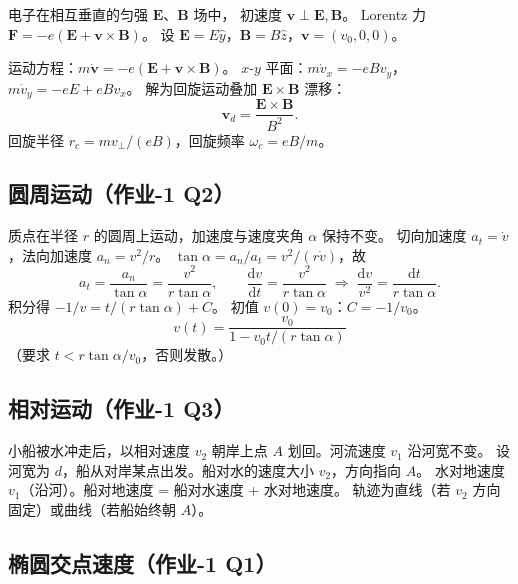 \documentclass[UTF8,a4paper,11pt]{ctexart}
\begin{document}
电子在相互垂直的匀强 $\boldsymbol E$、$\boldsymbol B$ 场中，
初速度 $\boldsymbol v\perp\boldsymbol E,\boldsymbol B$。
Lorentz 力 $\boldsymbol F=-e(\boldsymbol E+\boldsymbol v\times\boldsymbol B)$。
设 $\boldsymbol E=E\hat y$，$\boldsymbol B=B\hat z$，$\boldsymbol v=(v_0,0,0)$。

运动方程：$m\dot{\boldsymbol v}=-e(\boldsymbol E+\boldsymbol v\times\boldsymbol B)$。
$x$-$y$ 平面：$m\dot v_x=-eB v_y$，$m\dot v_y=-eE+eB v_x$。
解为回旋运动叠加 $\boldsymbol E\times\boldsymbol B$ 漂移：
\begin{equation}
  \boldsymbol v_d=\frac{\boldsymbol E\times\boldsymbol B}{B^2}.
\end{equation}
回旋半径 $r_c=mv_\perp/(eB)$，回旋频率 $\omega_c=eB/m$。

\subsection{圆周运动（作业-1 Q2）}
\label{sub:circle-alpha}

质点在半径 $r$ 的圆周上运动，加速度与速度夹角 $\alpha$ 保持不变。
切向加速度 $a_t=\dot v$，法向加速度 $a_n=v^2/r$。
$\tan\alpha=a_n/a_t=v^2/(r\dot v)$，故
\begin{equation}
  a_t=\frac{a_n}{\tan\alpha}=\frac{v^2}{r\tan\alpha},
  \qquad
  \frac{\mathrm dv}{\mathrm dt}=\frac{v^2}{r\tan\alpha}
  \;\Longrightarrow\;
  \frac{\mathrm dv}{v^2}=\frac{\mathrm dt}{r\tan\alpha}.
\end{equation}
积分得 $-1/v=t/(r\tan\alpha)+C$。
初值 $v(0)=v_0$：$C=-1/v_0$。
\begin{equation}
  \boxed{\;v(t)=\frac{v_0}{1-v_0 t/(r\tan\alpha)}\;}
\end{equation}
（要求 $t<r\tan\alpha/v_0$，否则发散。）

\subsection{相对运动（作业-1 Q3）}
\label{sub:boat}

小船被水冲走后，以相对速度 $v_2$ 朝岸上点 $A$ 划回。河流速度 $v_1$ 沿河宽不变。
设河宽为 $d$，船从对岸某点出发。船对水的速度大小 $v_2$，方向指向 $A$。
水对地速度 $v_1$（沿河）。船对地速度 = 船对水速度 + 水对地速度。
轨迹为直线（若 $v_2$ 方向固定）或曲线（若船始终朝 $A$）。

\subsection{椭圆交点速度（作业-1 Q1）}
\label{sub:ellipse-rot}
\end{document}
